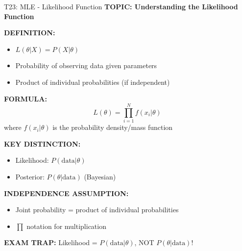 \documentclass[8pt]{beamer}
\begin{document}
	\begin{frame}{T23: MLE - Likelihood Function}
		\fontsize{6.5}{7.5}\selectfont
		\textbf{TOPIC: Understanding the Likelihood Function}
		
		\vspace{0.1cm}
		\textbf{DEFINITION:}
		\begin{itemize}
			\item $L(\theta | X) = P(X | \theta)$
			\item Probability of observing data given parameters
			\item Product of individual probabilities (if independent)
		\end{itemize}
		
		\vspace{0.1cm}
		\textbf{FORMULA:}
		\[
		L(\theta) = \prod_{i=1}^N f(x_i | \theta)
		\]
		where $f(x_i|\theta)$ is the probability density/mass function
		
		\vspace{0.1cm}
		\textbf{KEY DISTINCTION:}
		\begin{itemize}
			\item \textcolor{myblue}{Likelihood:} $P(\text{data} | \theta)$
			\item \textcolor{myblue}{Posterior:} $P(\theta | \text{data})$ (Bayesian)
		\end{itemize}
		
		\vspace{0.1cm}
		\textbf{INDEPENDENCE ASSUMPTION:}
		\begin{itemize}
			\item Joint probability = product of individual probabilities
			\item $\prod$ notation for multiplication
		\end{itemize}
		
		\textcolor{myred}{\textbf{EXAM TRAP:}} Likelihood = \textcolor{myblue}{$P(\text{data}|\theta)$}, NOT $P(\theta|\text{data})$!
	\end{frame}
	
\end{document}
